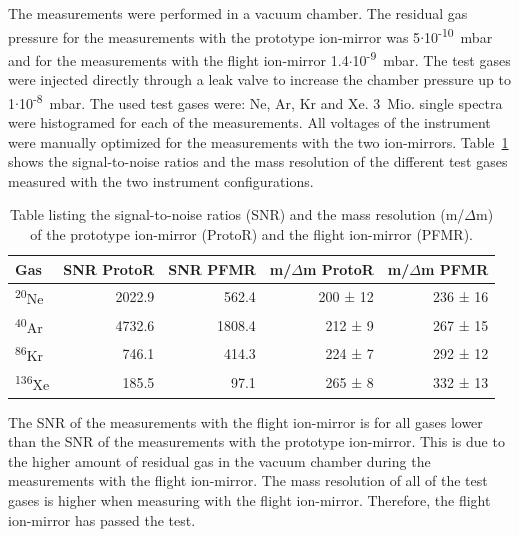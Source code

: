 	The measurements were performed in a vacuum chamber. The residual gas pressure for the measurements with the prototype ion-mirror was 5$\cdot$10\textsuperscript{-10}~mbar and for the measurements with the flight ion-mirror 1.4$\cdot$10\textsuperscript{-9}~mbar. The test gases were injected directly through a leak valve to increase the chamber pressure up to 1$\cdot$10\textsuperscript{-8}~mbar. The used test gases were: Ne, Ar, Kr and Xe. 3~Mio. single spectra were histogramed for each of the measurements. All voltages of the instrument were manually optimized for the measurements with the two ion-mirrors. Table~\ref{tab:refPerftab} shows the signal-to-noise ratios and the mass resolution of the different test gases measured with the two instrument configurations.\\
	\begin{table}
		\begin{center}
		\begin{tabular}{|l|r|r|r|r|}
			\hline
			Gas						&SNR ProtoR	&SNR PFMR	&m/$\Delta$m ProtoR	&m/$\Delta$m PFMR\\
			\hline
			\textsuperscript{20}Ne	&2022.9		&562.4		&200 ± 12		&236 ± 16\\
			\textsuperscript{40}Ar	&4732.6		&1808.4		&212 ±  9		&267 ± 15\\
			\textsuperscript{86}Kr	&746.1		&414.3		&224 ±  7		&292 ± 12\\
			\textsuperscript{136}Xe	&185.5		&97.1		&265 ±  8		&332 ± 13\\
			\hline
		\end{tabular}
		\end{center}
		\caption{Table listing the signal-to-noise ratios (SNR) and the mass resolution (m/$\Delta$m) of the prototype ion-mirror (ProtoR) and the flight ion-mirror (PFMR).}
		\label{tab:refPerftab}
	\end{table}
	The SNR of the measurements with the flight ion-mirror is for all gases lower than the SNR of the measurements with the prototype ion-mirror. This is due to the higher amount of residual gas in the vacuum chamber during the measurements with the flight ion-mirror. The mass resolution of all of the test gases is higher when measuring with the flight ion-mirror. Therefore, the flight ion-mirror has passed the test. 

	
